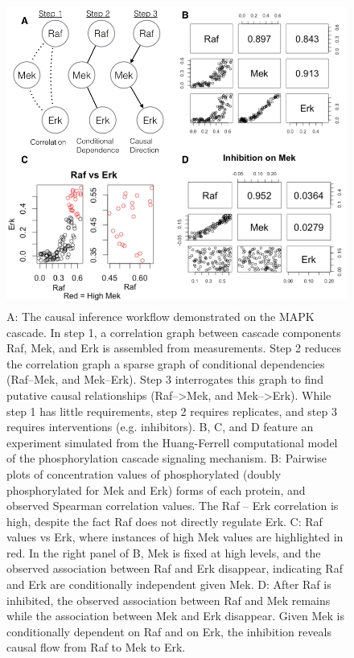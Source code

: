 \documentclass[journal=jacsat,manuscript=article]{achemso}
\begin{document}
\begin{figure}[!tpb]
\centerline{\includegraphics[width=1\textwidth]{figs/mapk.png}}
\caption{A: The causal inference workflow demonstrated on the MAPK cascade.  In step 1, a correlation graph between cascade components Raf, Mek, and Erk is assembled from measurements.  Step 2 reduces the correlation graph a sparse graph of conditional dependencies (Raf--Mek, and Mek--Erk).  Step 3 interrogates this graph to find putative causal relationships (Raf-->Mek, and Mek-->Erk).  While step 1 has little requirements, step 2 requires replicates, and step 3 requires interventions (e.g. inhibitors).  B, C, and D feature an experiment simulated from the Huang-Ferrell computational model of the phosphorylation cascade signaling mechanism.  B: Pairwise plots of concentration values of phosphorylated (doubly phosphorylated for Mek and Erk) forms of each protein, and observed Spearman correlation values.  The Raf -- Erk correlation is high, despite the fact Raf does not directly regulate Erk.  C: Raf values vs Erk, where instances of high Mek values are highlighted in red.  In the right panel of B, Mek is fixed at high levels, and the observed association between Raf and Erk disappear, indicating Raf and Erk are conditionally independent given Mek.  D: After Raf is inhibited, the observed association between Raf and Mek remains while the association between Mek and Erk disappear.  Given Mek is conditionally dependent on Raf and on Erk, the inhibition reveals causal flow from Raf to Mek to Erk.}
\label{mapk}
\end{figure}
\end{document}
